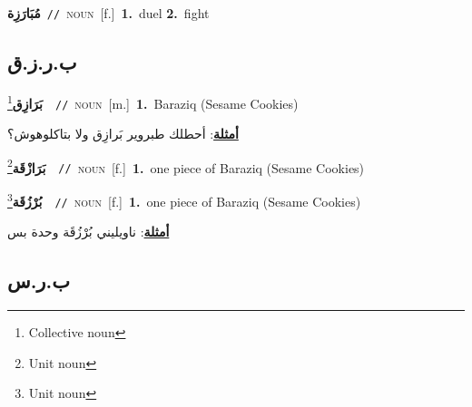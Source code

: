 \documentclass[10pt,a4paper,twoside]{article} %
\begin{document}
\begin{multicols}{2}
{\setlength\topsep{0pt}\textbf{\foreignlanguage{arabic}{مُبَارَزِة}}\ {\color{gray}\texttt{//}\color{black}}\ \textsc{noun}\ [f.]\ \textbf{1.}~duel  \textbf{2.}~fight\ } \vspace{2mm}

\vspace{-3mm}
\subsection*{\color{blue}\foreignlanguage{arabic}{ب.ر.ز.ق}\color{blue}{}} 

{\setlength\topsep{0pt}\textbf{\foreignlanguage{arabic}{بَرَازِق}}\footnote{Collective noun}\ \ {\color{gray}\texttt{//}\color{black}}\ \textsc{noun}\ [m.]\ \textbf{1.}~Baraziq  (Sesame Cookies)\  \begin{flushright}\color{gray}\foreignlanguage{arabic}{\textbf{\underline{\foreignlanguage{arabic}{أمثلة}}}: أحطلك طبروير بَرازِق ولا بتاكلوهوش؟}\end{flushright}\color{black}} \vspace{2mm}

{\setlength\topsep{0pt}\textbf{\foreignlanguage{arabic}{بَرَازْقَة}}\footnote{Unit noun}\ \ {\color{gray}\texttt{//}\color{black}}\ \textsc{noun}\ [f.]\ \textbf{1.}~one piece of Baraziq  (Sesame Cookies)\ } \vspace{2mm}

{\setlength\topsep{0pt}\textbf{\foreignlanguage{arabic}{بُرْزُقَة}}\footnote{Unit noun}\ \ {\color{gray}\texttt{//}\color{black}}\ \textsc{noun}\ [f.]\ \textbf{1.}~one piece of Baraziq  (Sesame Cookies)\  \begin{flushright}\color{gray}\foreignlanguage{arabic}{\textbf{\underline{\foreignlanguage{arabic}{أمثلة}}}: ناويليني بُرْزُقَة وحدة بس}\end{flushright}\color{black}} \vspace{2mm}

\vspace{-3mm}
\subsection*{\color{blue}\foreignlanguage{arabic}{ب.ر.س}\color{blue}{ (ntws)}} 


\end{multicols}
\end{document}
